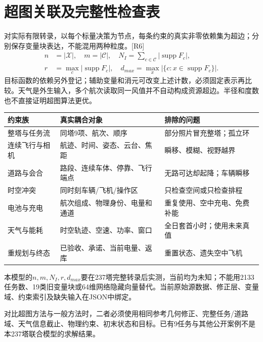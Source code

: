 \section{超图关联及完整性检查表}
\noindent 对实际有限转录，以每个标量决策为节点，每条约束的真实非零依赖集为超边；分别保存变量块表达，不能混用两种粒度。[R6]
\begin{align}
 n&=|\mathcal X|,\quad m=|\mathcal C|,\quad
 N_I=\sum_{c\in\mathcal C}|\operatorname{supp}F_c|,\\
 r&=\max_c|\operatorname{supp}F_c|,\quad
 d_{max}=\max_x|\{c:x\in\operatorname{supp}F_c\}|.
 \label{eng:eq:hypergraph}
\end{align}
\noindent 目标函数的依赖另外登记；辅助变量和消元可改变上述计数，必须固定表示再比较。天气是外生输入，多个航次读取同一风值并不自动构成资源超边。半径和度数也不直接证明超图算法更优。
\begin{center}\small
\begin{tabular}{p{.24\linewidth}p{.42\linewidth}p{.24\linewidth}}\toprule
约束族 & 真实耦合对象 & 排除的问题\\\midrule
整塔与任务流 & 同塔9项、航次、顺序 & 部分照片冒充整塔；孤立环\\
连续飞行与相机 & 航迹、时间、姿态、云台、焦距 & 瞬移、模糊、视野越界\\
道路与会合 & 路段、连续车体、停靠、飞行端点 & 无路可达却起降；车辆瞬移\\
时空冲突 & 同时刻车辆/飞机/操作区 & 只检查空间或只检查排程\\
电池与充电 & 航次组成、物理身份、电量和通道 & 重复使用、空中充电、免费补能\\
天气与能耗 & 时空轨迹、空速、功率、窗口 & 全日套首小时；使用未来真值\\
重规划与终态 & 已验收、承诺、当前电量、返库 & 重置状态、遗失空中飞机\\\bottomrule
\end{tabular}\end{center}
\noindent 本模型的$n,m,N_I,r,d_{max}$要在237塔完整转录后实测，当前均为未知；不能用2133任务数、19类旧变量块或64维网络隐藏向量替代。当前原始源数据、修正层、变量域、约束索引及缺失输入在JSON中绑定。

\noindent 对比超图方法与一般方法时，二者必须使用相同参考几何修正、完整任务/道路域、天气信息截止、物理约束、初末状态和目标。已有9任务与其他公开案例不是本237塔联合模型的求解结果。
\clearpage

